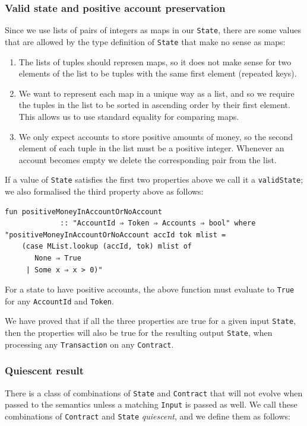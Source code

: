 \documentclass[runningheads]{llncs}
\begin{document}
\subsubsection{Valid state and positive account preservation}

Since we use lists of pairs of integers as maps in our \texttt{State}, there are some values that are allowed by the type definition of \texttt{State} that make no sense as maps:

\begin{enumerate}
    \item The lists of tuples should represen maps, so it does not make sense for two elements of the list to be tuples with the same first element (repeated keys).
    \item We want to represent each map in a unique way as a list, and so we require the tuples in the list to be sorted in ascending order by their first element. This allows us to use standard equality for comparing maps.
    \item We only expect accounts to store positive amounts of money, so the second element of each tuple in the list must be a positive integer. Whenever an account becomes empty we  delete the corresponding pair  from the list.
\end{enumerate}
\noindent
If a value of \texttt{State} satisfies the first two properties above we call it a \texttt{validState}; we also formalised the third property above as follows:

\begin{verbatim}
fun positiveMoneyInAccountOrNoAccount
             :: "AccountId ⇒ Token ⇒ Accounts ⇒ bool" where
"positiveMoneyInAccountOrNoAccount accId tok mlist =
    (case MList.lookup (accId, tok) mlist of
       None ⇒ True
     | Some x ⇒ x > 0)"
\end{verbatim}
\noindent
For a state to have positive accounts, the above function must evaluate to \texttt{True} for any \texttt{AccountId} and \texttt{Token}.

We have proved that if all the three properties are true for a given input \texttt{State}, then the properties will also be true for the resulting output \texttt{State}, when processing any \texttt{Transaction} on any \texttt{Contract}.

\subsubsection{Quiescent result}

There is a class of combinations of \texttt{State} and \texttt{Contract} that will not evolve when passed to the semantics unless a matching \texttt{Input} is passed as well. We call these combinations of \texttt{Contract} and \texttt{State} \textit{quiescent}, and we define them as follows:
\end{document}
